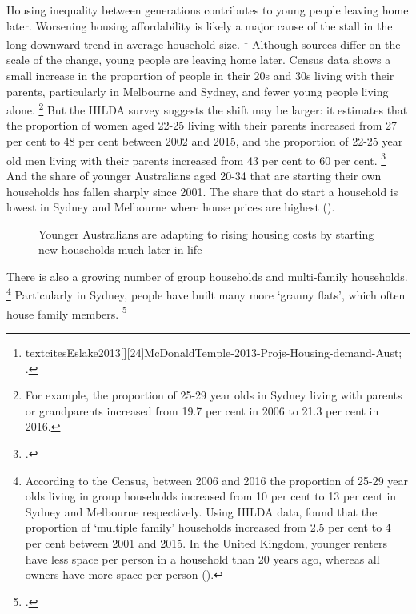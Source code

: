 Housing inequality between generations contributes to young people leaving home later.
Worsening housing affordability is likely a major cause of the stall in the long downward trend in average household size.%
	\footnote{textcites{Eslake2013}[][24]{McDonaldTemple-2013-Projs-Housing-demand-Aust}; .}
Although sources differ on the scale of the change, young people are leaving home later. 
Census data shows a small increase in the proportion of people in their 20s and 30s living with their parents, particularly in Melbourne and Sydney, and fewer young people living alone.%
    \footnote{For example, the proportion of 25-29 year olds in Sydney living with parents or grandparents increased from 19.7 per cent in 2006 to 21.3 per cent in 2016.}
But the HILDA survey suggests the shift may be larger: it estimates that the proportion of women aged 22-25 living with their parents increased from 27 per cent to 48 per cent between 2002 and 2015, and the proportion of 22-25 year old men living with their parents increased from 43 per cent to 60 per cent.%
	\footcite[][Figure~2.1]{Wilkins2017-HILDA-Selected-findings}
And the share of younger Australians aged 20-34 that are starting their own households has fallen sharply since 2001. The share that do start a household is lowest in Sydney and Melbourne where house prices are highest ().


\begin{figure}
\caption{Younger Australians are adapting to rising housing costs by starting new households much later in life}\label{fig:headsip-ratio}
{\textcite{Gradwell2017HousingBalance}}
\end{figure}

 


There is also a growing number of group households and multi-family households.%
	\footnote{According to the Census, between 2006 and 2016 the proportion of 25-29 year olds living in group households increased from 10 per cent to 13 per cent in Sydney and Melbourne respectively. Using HILDA data, \textcite[][6]{Wilkins2017-HILDA-Selected-findings} found that the proportion of `multiple family' households increased from 2.5 per cent to 4 per cent between 2001 and 2015. In the United Kingdom, younger renters have less space per person in a household than 20 years ago, whereas all owners have more space per person (\textcite{Corlett-Judge-2017-Housing-across-gens}).}
Particularly in Sydney, people have built many more `granny flats', which often house family members.%
	\footcites[][21]{Thomas-2016-Housing-supply-outcomes-from-Sydney-codification}{FuaryWagner-2015-Domain-Sydney-in-midst-of-grannyflat-boom}

